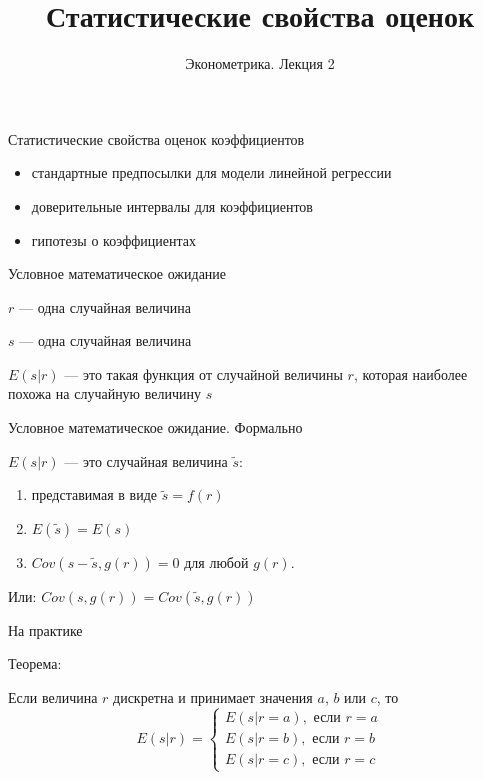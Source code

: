 \documentclass[russian,ignorenonframetext,]{beamer}
\author[Эконометрика. Лекция 2]{Эконометрика. Лекция 2}
\title{Статистические свойства оценок}
\date{}
\begin{document}
\frame{\titlepage}

\begin{frame}{Статистические свойства оценок коэффициентов}

\begin{itemize}
\item
  стандартные предпосылки для модели линейной регрессии
\item
  доверительные интервалы для коэффициентов
\item
  гипотезы о коэффициентах
\end{itemize}

\end{frame}

\begin{frame}{Условное математическое ожидание}

\(r\) --- одна случайная величина

\(s\) --- одна случайная величина

\(E(s|r)\) --- это такая функция от случайной величины \(r\), которая
наиболее похожа на случайную величину \(s\)

\end{frame}

\begin{frame}{Условное математическое ожидание. Формально}

\(E(s|r)\) --- это случайная величина \(\tilde{s}\):

\begin{enumerate}
\def\labelenumi{\arabic{enumi}.}
\item
  представимая в виде \(\tilde{s}=f(r)\)
\item
  \(E(\tilde{s})=E(s)\)
\item
  \(Cov(s-\tilde{s},g(r))=0\) для любой \(g(r)\).
\end{enumerate}

Или: \(Cov(s,g(r))=Cov(\tilde{s},g(r))\)

\end{frame}

\begin{frame}{На практике}

Теорема:

Если величина \(r\) дискретна и принимает значения \(a\), \(b\) или
\(c\), то \[
E(s|r)=\begin{cases}
E(s|r=a), \text{ если } r=a \\
E(s|r=b), \text{ если } r=b \\
E(s|r=c), \text{ если } r=c 
\end{cases}
\]

\end{frame}
\end{document}
